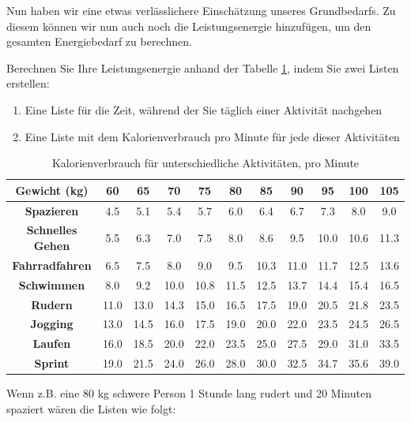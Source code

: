 Nun haben wir eine etwas verlässlichere Einschätzung unseres Grundbedarfs. Zu diesem können wir nun auch noch die Leistungsenergie hinzufügen, um den gesamten Energiebedarf zu berechnen.

\begin{mysubmission}\label{ex:leistungsumsatz}
	Berechnen Sie Ihre Leistungsenergie anhand der Tabelle \ref{tab:kcal}, indem Sie zwei Listen erstellen:
	\begin{enumerate}
		\item Eine Liste für die Zeit, während der Sie täglich einer Aktivität nachgehen
		\item Eine Liste mit dem Kalorienverbrauch pro Minute für jede dieser Aktivitäten
	\end{enumerate}

	\begin{table}[H]
		\centering
		\begin{tabular}{c|*{10}{c}}
			\textbf{Gewicht (kg)}    & 60   & 65   & 70   & 75   & 80   & 85   & 90   & 95   & 100  & 105  \\
			\midrule\midrule
			\textbf{Spazieren}       & 4.5  & 5.1  & 5.4  & 5.7  & 6.0  & 6.4  & 6.7  & 7.3  & 8.0  & 9.0  \\
			\midrule
			\textbf{Schnelles Gehen} & 5.5  & 6.3  & 7.0  & 7.5  & 8.0  & 8.6  & 9.5  & 10.0 & 10.6 & 11.3 \\
			\midrule
			\textbf{Fahrradfahren}   & 6.5  & 7.5  & 8.0  & 9.0  & 9.5  & 10.3 & 11.0 & 11.7 & 12.5 & 13.6 \\
			\midrule
			\textbf{Schwimmen}       & 8.0  & 9.2  & 10.0 & 10.8 & 11.5 & 12.5 & 13.7 & 14.4 & 15.4 & 16.5 \\
			\midrule
			\textbf{Rudern}          & 11.0 & 13.0 & 14.3 & 15.0 & 16.5 & 17.5 & 19.0 & 20.5 & 21.8 & 23.5 \\
			\midrule
			\textbf{Jogging}         & 13.0 & 14.5 & 16.0 & 17.5 & 19.0 & 20.0 & 22.0 & 23.5 & 24.5 & 26.5 \\
			\midrule
			\textbf{Laufen}          & 16.0 & 18.5 & 20.0 & 22.0 & 23.5 & 25.0 & 27.5 & 29.0 & 31.0 & 33.5 \\
			\midrule
			\textbf{Sprint}          & 19.0 & 21.5 & 24.0 & 26.0 & 28.0 & 30.0 & 32.5 & 34.7 & 35.6 & 39.0 \\
		\end{tabular}
		\caption{Kalorienverbrauch für unterschiedliche Aktivitäten, pro Minute}
		\label{tab:kcal}
	\end{table}
	Wenn z.B. eine 80 kg schwere Person 1 Stunde lang rudert und 20 Minuten spaziert wären die Listen wie folgt:

\end{mysubmission}
